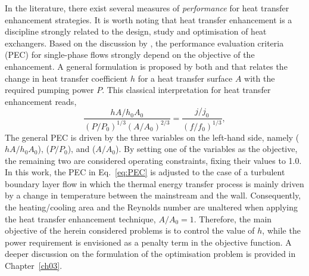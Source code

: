 In the literature, there exist several measures of \textit{performance} for heat transfer enhancement strategies. It is worth noting that heat transfer enhancement is a discipline strongly related to the design, study and optimisation of heat exchangers. Based on the discussion by \citet{manglik2003heat}, the performance evaluation criteria (PEC) for single-phase flows strongly depend on the objective of the enhancement. A general formulation is proposed by both \citet{manglik2003heat} and \citet{webb2005enhanced} that relates the change in heat transfer coefficient $h$ for a heat transfer surface $A$ with the required pumping power $P$. This classical interpretation for heat transfer enhancement reads,
\begin{equation}\label{eq:PEC}
    \frac{hA/h_{0} A_{0}}{(P/P_{0})^{1/3}(A/A_{0})^{2/3}} = \frac{j/j_{0}}{(f/f_{0})^{1/3}},
\end{equation}
The general PEC is driven by the three variables on the left-hand side, namely ($hA/h_0A_0$), ($P/P_0$), and ($A/A_0$). By setting one of the variables as the objective, the remaining two are considered operating constraints, fixing their values to 1.0. In this work, the PEC in Eq.~\eqref{eq:PEC} is adjusted to the case of a turbulent boundary layer flow in which the thermal energy transfer process is mainly driven by a change in temperature between the mainstream and the wall. Consequently, the heating/cooling area and the Reynolds number are unaltered when applying the heat transfer enhancement technique, $A/A_0 = 1$. Therefore, the main objective of the herein considered problems is to control the value of $h$, while the power requirement is envisioned as a penalty term in the objective function. A deeper discussion on the formulation of the optimisation problem is provided in Chapter~\ref{ch03}.

